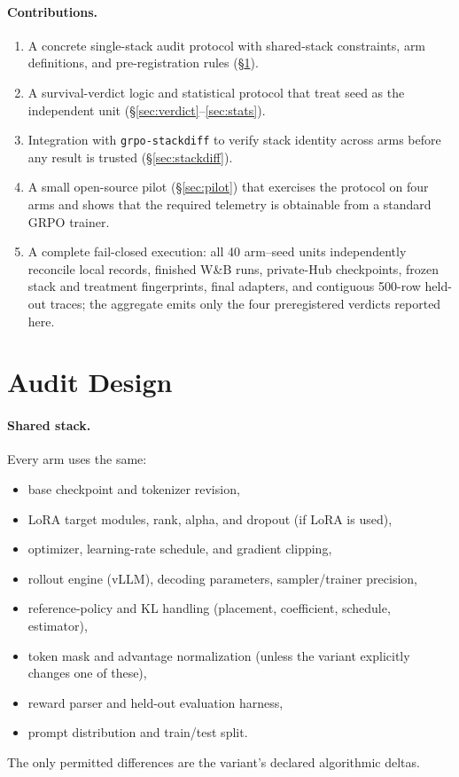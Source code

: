 \documentclass[11pt]{article}
\begin{document}
\paragraph{Contributions.}
\begin{enumerate}[leftmargin=1.6em, itemsep=2pt]
  \item A concrete single-stack audit protocol with shared-stack constraints,
    arm definitions, and pre-registration rules (\S\ref{sec:design}).
  \item A survival-verdict logic and statistical protocol that treat seed as
    the independent unit (\S\ref{sec:verdict}--\ref{sec:stats}).
  \item Integration with \texttt{grpo-stackdiff} to verify stack identity
    across arms before any result is trusted (\S\ref{sec:stackdiff}).
  \item A small open-source pilot (\S\ref{sec:pilot}) that exercises the
    protocol on four arms and shows that the required telemetry is obtainable
    from a standard GRPO trainer.
  \item A complete fail-closed execution: all 40 arm--seed units independently
    reconcile local records, finished W\&B runs, private-Hub checkpoints,
    frozen stack and treatment fingerprints, final adapters, and contiguous
    500-row held-out traces; the aggregate emits only the four preregistered
    verdicts reported here.
\end{enumerate}

\section{Audit Design}
\label{sec:design}


\paragraph{Shared stack.} Every arm uses the same:
\begin{itemize}[leftmargin=1.4em, itemsep=2pt]
  \item base checkpoint and tokenizer revision,
  \item LoRA target modules, rank, alpha, and dropout (if LoRA is used),
  \item optimizer, learning-rate schedule, and gradient clipping,
  \item rollout engine (vLLM), decoding parameters, sampler/trainer precision,
  \item reference-policy and KL handling (placement, coefficient, schedule,
    estimator),
  \item token mask and advantage normalization (unless the variant explicitly
    changes one of these),
  \item reward parser and held-out evaluation harness,
  \item prompt distribution and train/test split.
\end{itemize}
The only permitted differences are the variant's declared algorithmic deltas.
\end{document}
